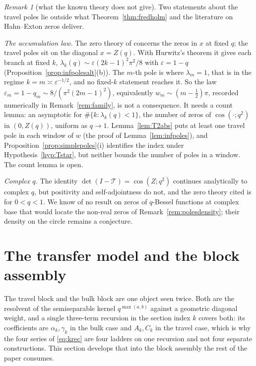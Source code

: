 \documentclass[11pt]{article}
\theoremstyle{plain}
\theoremstyle{definition}
\theoremstyle{remark}
\newtheorem{remark}[theorem]{Remark}
\begin{document}
\begin{remark}[what the known theory does not give]\label{rem:knowntheory}
Two statements about the travel poles lie outside what Theorem~\ref{thm:fredholm} and the
literature on Hahn--Exton zeros deliver.

\emph{The accumulation law.} The zero theory of \cite{KoelinkSwarttouw1994,StampachStovicek2014}
concerns the zeros in $x$ at fixed $q$; the travel poles sit on the diagonal $x=Z(q)$. With
Hurwitz's theorem it gives each branch at fixed $k$,
$\lambda_k(q)\sim\varepsilon(2k-1)^2\pi^2/8$ with $\varepsilon=1-q$
(Proposition~\ref{prop:infpolesalt}\textup{(b)}). The $m$-th pole is where $\lambda_m=1$, that is
in the regime $k=m\asymp\varepsilon^{-1/2}$, and no fixed-$k$ statement reaches it. So the law
$\varepsilon_m=1-q_m\sim8/(\pi^2(2m-1)^2)$, equivalently $w_m\sim(m-\tfrac12)\pi$, recorded
numerically in Remark~\ref{rem:family}, is not a consequence. It needs a count lemma: an asymptotic
for $\#\{k:\lambda_k(q)<1\}$, the number of zeros of $\cos(\cdot;q^2)$ in $(0,Z(q))$, uniform as
$q\to1$. Lemma~\ref{lem:T2abs} puts at least one travel pole in each window of $w$ (the proof of
Lemma~\ref{lem:infpoles}), and Proposition~\ref{prop:simplepoles}\textup{(i)} identifies the index
under Hypothesis~\ref{hyp:Tstar}, but neither bounds the number of poles in a window. The count
lemma is open.

\emph{Complex $q$.} The identity $\det(I-\mathcal T)=\cos(Z;q^2)$ continues analytically to complex
$q$, but positivity and self-adjointness do not, and the zero theory cited is for $0<q<1$. We know of
no result on zeros of $q$-Bessel functions at complex base that would locate the non-real zeros of
Remark~\ref{rem:polesdensity}; their density on the circle remains a conjecture.
\end{remark}

\section{The transfer model and the block assembly}\label{sec:assembly}

The travel block and the bulk block are one object seen twice. Both are the resolvent of the
semiseparable kernel $q^{\max(a,b)}$ against a geometric diagonal weight, and a single three-term
recursion in the section index $k$ covers both: its coefficients are $\alpha_k,\gamma_k$ in the
bulk case and $A_k,C_k$ in the travel case, which is why the four series of \eqref{eq:krec} are
four ladders on one recursion and not four separate constructions. This section develops that into
the block assembly the rest of the paper consumes.
\end{document}

